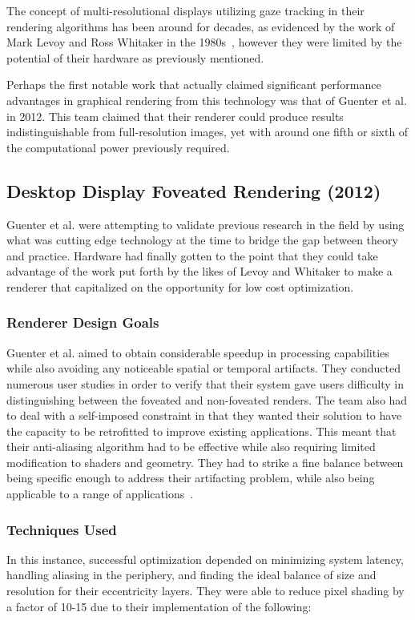 \documentclass{sig-alternate}
\begin{document}
The concept of multi-resolutional displays utilizing gaze tracking in their rendering algorithms has been around for decades, as evidenced by the work of Mark Levoy and Ross Whitaker in the 1980s~\cite{Levoy:Gaze}, however they were limited by the potential of their hardware as previously mentioned.

Perhaps the first notable work that actually claimed significant performance advantages in graphical rendering from this technology was that of Guenter et al. in 2012. This team  claimed that their renderer could produce results indistinguishable from full-resolution images, yet with around one fifth or sixth of the computational power previously required.

\subsection{Desktop Display Foveated Rendering (2012)}
\label{sec:microsoft}
Guenter et al. were attempting to validate previous research in the field by using what was cutting edge technology at the time to bridge the gap between theory and practice. Hardware had finally gotten to the point that they could take advantage of the work put forth by the likes of Levoy and Whitaker to make a renderer that capitalized on the opportunity for low cost optimization.

\subsubsection{Renderer Design Goals}
\label{mDesignGoals}
Guenter et al. aimed to obtain considerable speedup in processing capabilities while also avoiding any noticeable spatial or temporal artifacts. They conducted numerous user studies in order to verify that their system gave users difficulty in distinguishing between the foveated and non-foveated renders. The team also had to deal with a self-imposed constraint in that they wanted their solution to have the capacity to be retrofitted to improve existing applications. This meant that their anti-aliasing algorithm had to be effective while also requiring limited modification to shaders and geometry. They had to strike a fine balance between being specific enough to address their artifacting problem, while also being applicable to a range of applications~\cite{Guenter:Foveated}.

\subsubsection{Techniques Used}
\label{mTechniques}
In this instance, successful optimization depended on minimizing system latency, handling aliasing in the periphery, and finding the ideal balance of size and resolution for their eccentricity layers. They were able to reduce pixel shading by a factor of 10-15 due to their implementation of the following:
\end{document}
